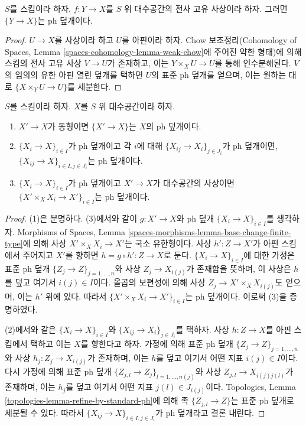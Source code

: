 \begin{lemma}
\label{lemma-surjective-proper-ph}
$S$를 스킴이라 하자. $f : Y \to X$를 $S$ 위 대수공간의 전사 고유
사상이라 하자. 그러면 $\{Y \to X\}$는 ph 덮개이다.
\end{lemma}

\begin{proof}
$U \to X$를 사상이라 하고 $U$를 아핀이라 하자. Chow 보조정리(Cohomology of
Spaces, Lemma \ref{spaces-cohomology-lemma-weak-chow}에 주어진 약한
형태)에 의해 스킴의 전사 고유 사상 $V \to U$가 존재하고, 이는
$Y \times_X U \to U$를 통해 인수분해된다. $V$의 임의의 유한 아핀 열린
덮개를 택하면 $U$의 표준 ph 덮개를 얻으며, 이는 원하는 대로
$\{X \times_Y U \to U\}$를 세분한다.
\end{proof}

\begin{lemma}
\label{lemma-ph}
$S$를 스킴이라 하자. $X$를 $S$ 위 대수공간이라 하자.
\begin{enumerate}
\item $X' \to X$가 동형이면 $\{X' \to X\}$는 $X$의 ph 덮개이다.
\item $\{X_i \to X\}_{i\in I}$가 ph 덮개이고 각 $i$에 대해
$\{X_{ij} \to X_i\}_{j\in J_i}$가 ph 덮개이면,
$\{X_{ij} \to X\}_{i \in I, j\in J_i}$는 ph 덮개이다.
\item $\{X_i \to X\}_{i\in I}$가 ph 덮개이고 $X' \to X$가
대수공간의 사상이면
$\{X' \times_X X_i \to X'\}_{i\in I}$는 ph 덮개이다.
\end{enumerate}
\end{lemma}

\begin{proof}
(1)은 분명하다. (3)에서와 같이 $g : X' \to X$와 ph 덮개
$\{X_i \to X\}_{i\in I}$를 생각하자. Morphisms of Spaces, Lemma
\ref{spaces-morphisms-lemma-base-change-finite-type}에 의해 사상
$X' \times_X X_i \to X'$는 국소 유한형이다. 사상 $h' : Z \to X'$가
아핀 스킴에서 주어지고 $X'$를 향하면 $h = g \circ h' : Z \to X$로 둔다.
$\{X_i \to X\}_{i\in I}$에 대한 가정은 표준 ph 덮개
$\{Z_j \to Z\}_{j = 1, \ldots, n}$와 사상 $Z_j \to X_{i(j)}$가
존재함을 뜻하며, 이 사상은 $h$를 덮고 여기서 $i(j) \in I$이다. 올곱의
보편성에 의해 사상 $Z_j \to X' \times_X X_{i(j)}$도 얻으며, 이는
$h'$ 위에 있다. 따라서
$\{X' \times_X X_i \to X'\}_{i\in I}$는 ph 덮개이다. 이로써 (3)을
증명하였다.

\medskip\noindent
(2)에서와 같은 $\{X_i \to X\}_{i\in I}$와
$\{X_{ij} \to X_i\}_{j\in J_i}$를 택하자. 사상 $h : Z \to X$를 아핀
스킴에서 택하고 이는 $X$를 향한다고 하자. 가정에 의해 표준 ph 덮개
$\{Z_j \to Z\}_{j = 1, \ldots, n}$와 사상
$h_j : Z_j \to X_{i(j)}$가 존재하며, 이는 $h$를 덮고 여기서 어떤 지표
$i(j) \in I$이다.
다시 가정에 의해
표준 ph 덮개 $\{Z_{j, l} \to Z_j\}_{l = 1, \ldots, n(j)}$와 사상
$Z_{j, l} \to X_{i(j)j(l)}$가 존재하며, 이는 $h_j$를 덮고 여기서 어떤 지표
$j(l) \in J_{i(j)}$이다. Topologies, Lemma
\ref{topologies-lemma-refine-by-standard-ph}에 의해 족
$\{Z_{j, l} \to Z\}$는 표준 ph 덮개로 세분될 수 있다. 따라서
$\{X_{ij} \to X\}_{i \in I, j\in J_i}$가 ph 덮개라고 결론 내린다.
\end{proof}

